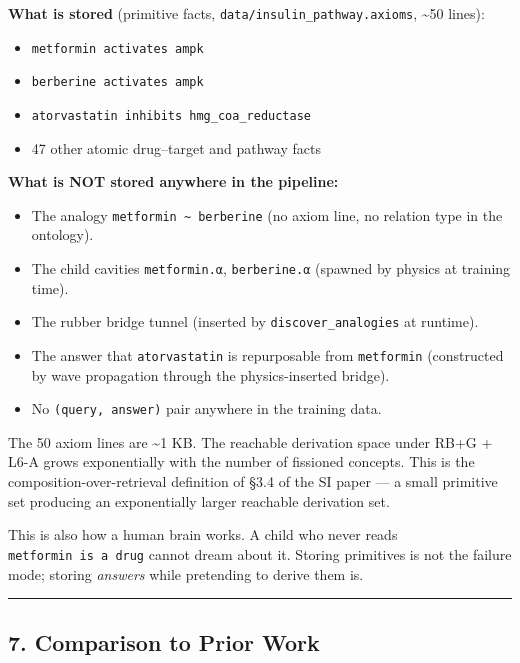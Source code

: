 \documentclass[
  11pt,
  a4paper,
]{article}
\providecommand{\tightlist}{%
  \setlength{\itemsep}{0pt}\setlength{\parskip}{0pt}}
\begin{document}
\textbf{What is stored} (primitive facts,
\texttt{data/insulin\_pathway.axioms}, \textasciitilde50 lines):

\begin{itemize}
\tightlist
\item
  \texttt{metformin\ activates\ ampk}
\item
  \texttt{berberine\ activates\ ampk}
\item
  \texttt{atorvastatin\ inhibits\ hmg\_coa\_reductase}
\item
  47 other atomic drug--target and pathway facts
\end{itemize}

\textbf{What is NOT stored anywhere in the pipeline:}

\begin{itemize}
\tightlist
\item
  The analogy \texttt{metformin\ \textasciitilde{}\ berberine} (no axiom
  line, no relation type in the ontology).
\item
  The child cavities \texttt{metformin.α}, \texttt{berberine.α} (spawned
  by physics at training time).
\item
  The rubber bridge tunnel (inserted by \texttt{discover\_analogies} at
  runtime).
\item
  The answer that \texttt{atorvastatin} is repurposable from
  \texttt{metformin} (constructed by wave propagation through the
  physics-inserted bridge).
\item
  No \texttt{(query,\ answer)} pair anywhere in the training data.
\end{itemize}

The 50 axiom lines are \textasciitilde1 KB. The reachable derivation
space under RB+G + L6-A grows exponentially with the number of fissioned
concepts. This is the composition-over-retrieval definition of §3.4 of
the SI paper --- a small primitive set producing an exponentially larger
reachable derivation set.

This is also how a human brain works. A child who never reads
\texttt{metformin\ is\ a\ drug} cannot dream about it. Storing
primitives is not the failure mode; storing \emph{answers} while
pretending to derive them is.

\begin{center}\rule{0.5\linewidth}{0.5pt}\end{center}

\subsection{7. Comparison to Prior Work}\label{comparison-to-prior-work}
\end{document}
